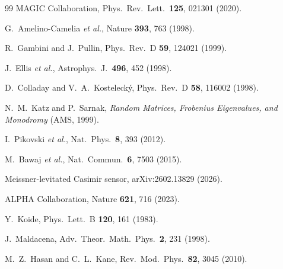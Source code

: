 \documentclass[aps,prd,twocolumn,superscriptaddress,longbibliography,nofootinbib]{revtex4-2}
\begin{document}
\begin{thebibliography}{99}
  MAGIC Collaboration, Phys.\ Rev.\ Lett.\ \textbf{125}, 021301 (2020).

  G.~Amelino-Camelia \textit{et al.}, Nature \textbf{393}, 763 (1998).

  R.~Gambini and J.~Pullin, Phys.\ Rev.\ D \textbf{59}, 124021 (1999).

  J.~Ellis \textit{et al.}, Astrophys.\ J.\ \textbf{496}, 452 (1998).

  D.~Colladay and V.~A.~Kosteleck\'y, Phys.\ Rev.\ D \textbf{58},
  116002 (1998).

  N.~M.~Katz and P.~Sarnak,
  \textit{Random Matrices, Frobenius Eigenvalues, and Monodromy}
  (AMS, 1999).

  I.~Pikovski \textit{et al.}, Nat.\ Phys.\ \textbf{8}, 393 (2012).

  M.~Bawaj \textit{et al.}, Nat.\ Commun.\ \textbf{6}, 7503 (2015).

  Meissner-levitated Casimir sensor, arXiv:2602.13829 (2026).

  ALPHA Collaboration, Nature \textbf{621}, 716 (2023).

  Y.~Koide, Phys.\ Lett.\ B \textbf{120}, 161 (1983).

  J.~Maldacena, Adv.\ Theor.\ Math.\ Phys.\ \textbf{2}, 231 (1998).

  M.~Z.~Hasan and C.~L.~Kane, Rev.\ Mod.\ Phys.\ \textbf{82}, 3045 (2010).

\end{thebibliography}
\end{document}
